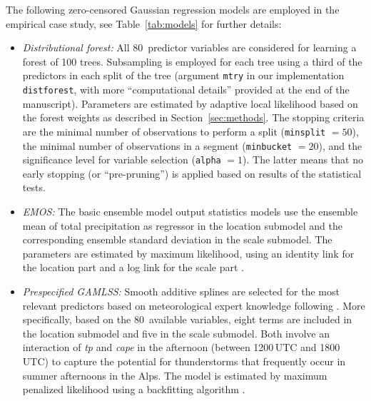 \documentclass[aoas, preprint]{imsart}
\numberwithin{equation}{subsection}
\begin{document}
The following zero-censored Gaussian regression models are employed
in the empirical case study, see Table~\ref{tab:models} for
further details:
%
\begin{itemize}

\item \emph{Distributional forest:} All 80~predictor variables are
  considered for learning a forest of 100 trees. Subsampling is employed 
  for each tree using a third of the predictors in each split of the tree
  (argument \texttt{mtry} in our implementation \texttt{distforest},
  with more ``computational details'' provided at the end of the manuscript).
  Parameters are estimated by
  adaptive local likelihood based on the forest weights as described
  in Section~\ref{sec:methods}. 
  The stopping criteria are the minimal number of observations to perform a split 
  (\texttt{minsplit} $= 50$), the minimal number of observations in a 
  segment (\texttt{minbucket} $= 20$), and the significance level 
  for variable selection (\texttt{alpha} $= 1$). The latter means
  that no early stopping (or ``pre-pruning'') is applied
  based on results of the statistical tests.
  
  

\item \emph{EMOS:} The basic ensemble model output statistics
  models use the ensemble mean of total precipitation as regressor in the location
  submodel and the corresponding ensemble standard deviation in the scale submodel.
  The parameters are estimated by maximum likelihood, using an identity
  link for the location part and a log link for the scale part
  \citep[following the advice of][]{Gebetsberger+Messner+Mayr:2017}.

\item \emph{Prespecified GAMLSS:} Smooth additive splines are selected for
  the most relevant predictors based on meteorological expert knowledge
  following \cite{Stauffer+Umlauf+Messner:2017}. More specifically, based
  on the 80~available variables, eight terms are included in the location
  submodel and five in the scale submodel. Both involve an interaction of
  \emph{tp} and \emph{cape} in the afternoon (between 1200\,UTC and 1800\,UTC)
  to capture the potential for thunderstorms that frequently occur in
  summer afternoons in the Alps. The model is estimated by maximum
  penalized likelihood using a backfitting algorithm \citep{Stasinopoulos+Rigby:2007}.


\end{itemize}
\end{document}
